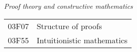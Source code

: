 {\it Proof theory and constructive mathematics} \\[4pt]
\begin{tabular}{ll}
\phantom{XX} 03F07   &  Structure of proofs\\
\phantom{XX} 03F55   &  Intuitionistic mathematics\\
\end{tabular}

